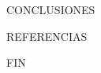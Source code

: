 \documentclass[11pt]{beamer}
\begin{document}
\begin{frame}
\begin{figure}[H]
\end{figure}
\end{frame}


\begin{frame}{CONCLUSIONES}
\end{frame}

\begin{frame}{REFERENCIAS}
\end{frame}


\begin{frame}{FIN}
\end{frame}



\end{document}
